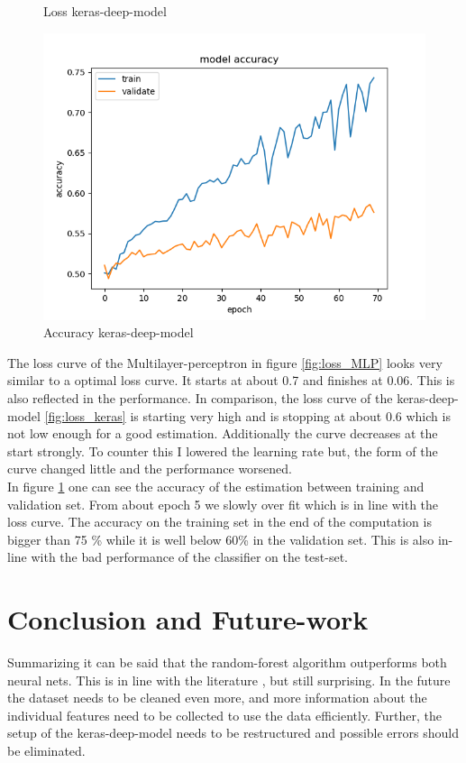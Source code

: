 \documentclass[12pt]{article}
\begin{document}
\begin{figure}[!htb]
  \caption{Loss keras-deep-model}\label{fig:loss_keras}
\endminipage\hfill
{}%
  \includegraphics[width=\linewidth]{./figures/keras-deep-model-accuracy-curve.png}
  \caption{Accuracy keras-deep-model}\label{fig:accuracy_keras}
\endminipage
\end{figure}

The loss curve of the Multilayer-perceptron in figure \ref{fig:loss_MLP} looks very similar to a optimal loss curve. It starts at about 0.7 and finishes at 0.06. This is also  reflected in the performance. In comparison, the loss curve of the keras-deep-model \ref{fig:loss_keras} is starting very high and is stopping at about 0.6 which is not low enough for a good estimation. Additionally the curve decreases at the start strongly. To counter this I lowered the learning rate but, the form of the curve changed little and the performance worsened.\\In figure \ref{fig:accuracy_keras} one can see the accuracy of the estimation between training and validation set. From about epoch 5 we slowly over fit which is in line with the loss curve. The accuracy on the training set in the end of the computation is bigger than 75 \% while it is well below 60\% in the validation set. This  is also in-line with the bad performance of the classifier on the test-set.
 
\section{Conclusion and Future-work}\label{sec:Conclusio}
Summarizing it can be said that the random-forest algorithm outperforms both neural nets. This is in line with the literature \cite{robinson2020}, but still surprising.
%
In the future the dataset needs to be cleaned even more, and more information about the individual features need to be collected to use the data efficiently.
%
Further, the setup of the keras-deep-model needs to be restructured and possible errors should be eliminated.



\end{document}
